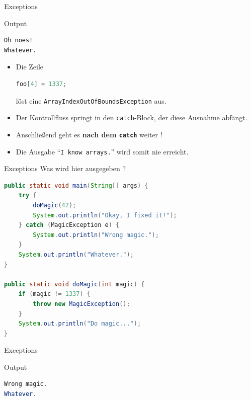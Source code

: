 \documentclass[18pt]{beamer}
\newcommand{\quotes}[1]{``#1''}
\begin{document}
\begin{frame}[fragile]{Exceptions}
    \begin{block}{Output}
        \begin{lstlisting}
Oh noes!
Whatever.
        \end{lstlisting}

    \end{block}

    \pause

    \begin{itemize}
        \item Die Zeile \begin{lstlisting}[language=Java,basicstyle=\scriptsize]
foo[4] = 1337;
        \end{lstlisting}
        löst eine \texttt{ArrayIndexOutOfBoundsException} aus.
        \item Der Kontrollfluss springt in den \texttt{catch}-Block, der diese Ausnahme abfängt.
        \item Anschließend geht es \textbf{\alert{nach dem \texttt{catch}}} weiter !
        \item Die Ausgabe \quotes{\texttt{I know arrays.}} wird somit nie erreicht.

    \end{itemize}

\end{frame}


\begin{frame}[fragile]{Exceptions}
    Was wird hier ausgegeben ?
    \begin{exampleblock}{}
        \begin{lstlisting}[language=Java,basicstyle=\scriptsize]
public static void main(String[] args) {
    try {
        doMagic(42);
        System.out.println("Okay, I fixed it!");
    } catch (MagicException e) {
        System.out.println("Wrong magic.");
    }
    System.out.println("Whatever.");
}

public static void doMagic(int magic) {
    if (magic != 1337) {
        throw new MagicException();
    }
    System.out.println("Do magic...");
}
        \end{lstlisting}

    \end{exampleblock}

\end{frame}

\begin{frame}[fragile]{Exceptions}
    \begin{block}{Output}
        \begin{lstlisting}[language=Java]
Wrong magic.
Whatever.
        \end{lstlisting}

    \end{block}

\end{frame}
\end{document}
